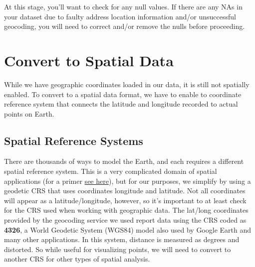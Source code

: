 \documentclass[
  letterpaper,
  DIV=11,
  numbers=noendperiod]{scrreprt}
\begin{document}
\begin{tcolorbox}[enhanced jigsaw, colframe=quarto-callout-tip-color-frame, bottomtitle=1mm, bottomrule=.15mm, colback=white, arc=.35mm, titlerule=0mm, colbacktitle=quarto-callout-tip-color!10!white, coltitle=black, title=\textcolor{quarto-callout-tip-color}{\faLightbulb}\hspace{0.5em}{Nulls in your data?}, opacitybacktitle=0.6, leftrule=.75mm, breakable, opacityback=0, left=2mm, rightrule=.15mm, toprule=.15mm, toptitle=1mm]

At this stage, you'll want to check for any null values. If there are
any NAs in your dataset due to faulty address location information
and/or unsuccessful geocoding, you will need to correct and/or remove
the nulls before proceeding.

\end{tcolorbox}

\section{Convert to Spatial Data}\label{GA-spatial-dataframe}

While we have geographic coordinates loaded in our data, it is still not
spatially enabled. To convert to a spatial data format, we have to
enable to coordinate reference system that connects the latitude and
longitude recorded to actual points on Earth.

\subsection{Spatial Reference Systems}\label{spatial-reference-systems}

There are thousands of ways to model the Earth, and each requires a
different spatial reference system. This is a very complicated domain of
spatial applications (for a primer
\href{https://developers.arcgis.com/documentation/core-concepts/spatial-references}{see
here}), but for our purposes, we simplify by using a geodetic CRS that
uses coordinates longitude and latitude. Not all coordinates will appear
as a latitude/longitude, however, so it's important to at least check
for the CRS used when working with geographic data. The lat/long
coordinates provided by the geocoding service we used report data using
the CRS coded as \textbf{4326}, a World Geodetic System (WGS84) model
also used by Google Earth and many other applications. In this system,
distance is measured as degrees and distorted. So while useful for
visualizing points, we will need to convert to another CRS for other
types of spatial analysis.
\end{document}

